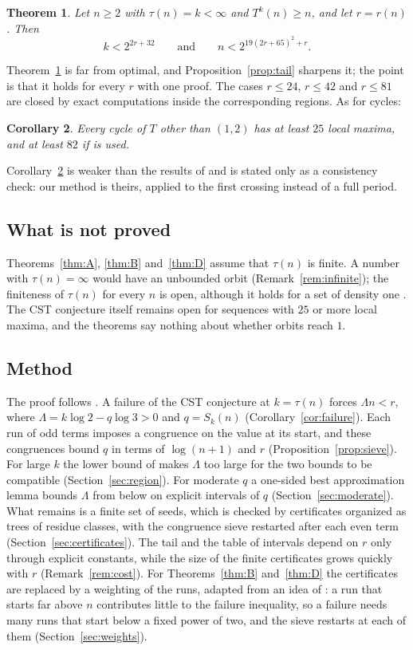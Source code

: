 \documentclass[11pt]{amsart}
\newtheorem{mainthm}{Theorem}
\newtheorem{maincor}[mainthm]{Corollary}
\theoremstyle{definition}
\theoremstyle{remark}
\begin{document}
\begin{mainthm}\label{thm:C}
Let $n\ge2$ with $\tau(n)=k<\infty$ and $T^{k}(n)\ge n$, and let $r=r(n)$. Then
\[
k<2^{2r+32}\qquad\text{and}\qquad n<2^{19(2r+65)^2+r}.
\]
\end{mainthm}

Theorem~\ref{thm:C} is far from optimal, and Proposition~\ref{prop:tail} sharpens it; the point is that it holds for every $r$ with one proof. The cases $r\le24$, $r\le42$ and $r\le81$ are closed by exact computations inside the corresponding regions. As for cycles:

\begin{maincor}\label{cor:cycles}
Every cycle of $T$ other than $(1,2)$ has at least $25$ local maxima, and at least $82$ if \cite[Corollary~5.4]{RT26} is used.
\end{maincor}

Corollary~\ref{cor:cycles} is weaker than the results of \cite{SdW05,Her23} and is stated only as a consistency check: our method is theirs, applied to the first crossing instead of a full period.

\subsection*{What is not proved}
Theorems~\ref{thm:A}, \ref{thm:B} and~\ref{thm:D} assume that $\tau(n)$ is finite. A number with $\tau(n)=\infty$ would have an unbounded orbit (Remark~\ref{rem:infinite}); the finiteness of $\tau(n)$ for every $n$ is open, although it holds for a set of density one \cite{Ter76,Eve77}. The CST conjecture itself remains open for sequences with $25$ or more local maxima, and the theorems say nothing about whether orbits reach $1$.

\subsection*{Method}
The proof follows \cite{SdW05}. A failure of the CST conjecture at $k=\tau(n)$ forces $\Lambda n<r$, where $\Lambda=k\log2-q\log3>0$ and $q=S_k(n)$ (Corollary~\ref{cor:failure}). Each run of odd terms imposes a congruence on the value at its start, and these congruences bound $q$ in terms of $\log(n+1)$ and $r$ (Proposition~\ref{prop:sieve}). For large $k$ the lower bound of \cite{LMN95} makes $\Lambda$ too large for the two bounds to be compatible (Section~\ref{sec:region}). For moderate $q$ a one-sided best approximation lemma bounds $\Lambda$ from below on explicit intervals of $q$ (Section~\ref{sec:moderate}). What remains is a finite set of seeds, which is checked by certificates organized as trees of residue classes, with the congruence sieve restarted after each even term (Section~\ref{sec:certificates}). The tail and the table of intervals depend on $r$ only through explicit constants, while the size of the finite certificates grows quickly with $r$ (Remark~\ref{rem:cost}). For Theorems~\ref{thm:B} and~\ref{thm:D} the certificates are replaced by a weighting of the runs, adapted from an idea of \cite{Her23}: a run that starts far above $n$ contributes little to the failure inequality, so a failure needs many runs that start below a fixed power of two, and the sieve restarts at each of them (Section~\ref{sec:weights}).
\end{document}
